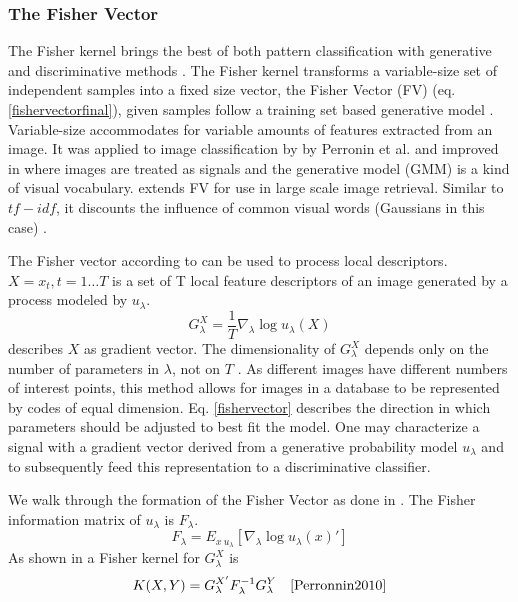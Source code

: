 \documentclass[english,12pt,a4paper,pdftex,elec,utf8, table]{aaltothesis}
\begin{document}
\subsubsection{The Fisher Vector}\label{FV}
The Fisher kernel brings the best of both pattern classification with generative and discriminative methods \cite{Jaakkola1999}. The Fisher kernel transforms a variable-size set of independent samples into a fixed size vector, the Fisher Vector (FV) (eq. \ref{fishervectorfinal}), given samples follow a training set based generative model \cite{Jaakkola1999}. Variable-size accommodates for variable amounts of features extracted from an image. It was applied to image classification by by Perronin et al. \cite{Perronnin2007} and improved in \cite{Perronnin2010} where images are treated as signals and the generative model (GMM) is a kind of visual vocabulary. \cite{Perronnin2010a} extends FV for use in large scale image retrieval. Similar to $tf-idf$, it discounts the influence of common visual words (Gaussians in this case) \cite{Perronnin2010a}.

The Fisher vector according to \cite{Perronnin2010} can be used to process local descriptors. $X = {x_t, t = 1 \ldots T}$ is a set of T local feature descriptors of an image generated by a process modeled by $u_\lambda$.
\begin{equation}\label{fishervector}
 G_\lambda^X = \frac{1}{T}\nabla_\lambda\log u_\lambda(X)
\end{equation}
describes $X$ as gradient vector. The dimensionality of $G_\lambda^X$ depends only on the number of parameters in $\lambda$, not on $T$ \cite{Perronnin2010}. As different images have different numbers of interest points, this method allows for images in a database to be represented by codes of equal dimension. Eq. \ref{fishervector} describes the direction in which parameters should be adjusted to best fit the model. One may characterize a signal with a gradient vector derived from a generative probability model $u_\lambda$ and to subsequently feed this representation to a discriminative classifier. \cite{Perronnin2007}

We walk through the formation of the Fisher Vector as done in \cite{Perronnin2010}. The Fisher information matrix of $u_\lambda$ is $F_\lambda$.
\begin{equation}\label{fishermatrix}
F_\lambda = E_{x~u_\lambda}[\nabla_\lambda\log u_\lambda(x)']
\end{equation}
As shown in \cite{Jaakkola1999} a Fisher kernel for $G_\lambda^X$ is
\begin{equation}\label{fisherkernel}
K(X,Y) = G_\lambda^{X'}F_\lambda^{-1}G_\lambda^Y \quad \cite{Perronnin2010}
\end{equation}
\end{document}
